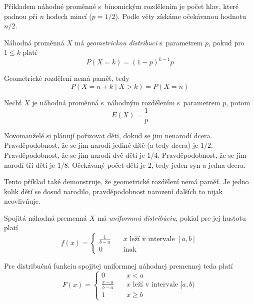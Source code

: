 {\begin{example}
    Příkladem náhodné proměnné s~binomickým rozdělením je
    počet hlav, které padnou při $n$ hodech mincí ($p = 1/2$).
    Podle věty získáme očekávanou hodnotu $n/2$.
\end{example}

\begin{definition}
    Náhodná proměnná $X$ má {\em geometrickou distribuci} s~parametrem
    $p$, pokud pro $1 \leq k$ platí
\[
    P(X = k) = (1-p)^{k-1} p
\]
\end{definition}

\begin{claim}
    Geometrické rozdělení nemá paměť, tedy
    \[
        P(X = n + k \mid X > k) = P(X = n)
    \]
\end{claim}

\begin{theorem}
    Nechť $X$ je náhodná proměnná s~náhodným rozdělením s~parametrem
    $p$, potom
    \[
        E(X) = \frac{1}{p}
    \]
\end{theorem}

\begin{example}
    Novomanželé si plánují pořizovat děti, dokud se jim nenarodí dcera.
    Pravděpodobnost, že se jim narodí jediné dítě (a tedy dcera) je $1/2$.
    Pravděpodobnost, že se jim narodí dvě děti je $1/4$.
    Pravděpodobnost, že se jim narodí tři děti je $1/8$.
    Očekávaný počet dětí je $2$, tedy jeden syn a jedna dcera.

    Tento příklad také demonstruje, že geometrické rozdělení nemá paměť.
    Je jedno kolik dětí se dosud narodilo, pravděpodobnost narození
    dalších to nijak neovlivňuje.
\end{example}

\begin{definition}
    Spojitá náhodná premenná $X$ má {\em uniformnú distribúciu},
    pokiaľ pre jej hustotu platí
    \[
        f(x) = 
			\begin{cases}
				\frac{1}{b-a} &\quad x \text{ leží v intervale }[a,b]\\
				0 &\quad\text{inak}
			\end{cases}
    \]
\end{definition}

Pre distribučnú funkciu spojitej uniformnej náhodnej premennej teda platí
	\[
        F(x) = 
			\begin{cases}
				0 &\quad x < a \\
				\frac{x-a}{b-a} &\quad x \text{ leží v intervale }[a,b)\\
				1 &\quad x \geq b
			\end{cases}
    \]

}
